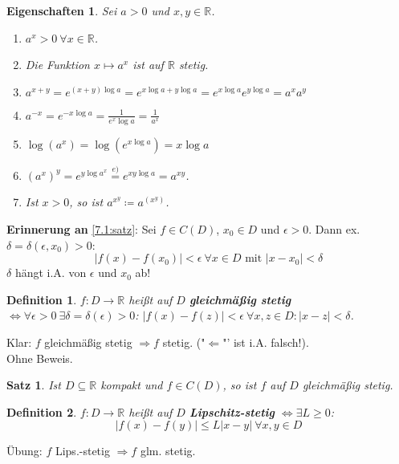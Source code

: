 \documentclass[12pt]{extreport} %
\newcommand{\R}{\mathbb{R}}
\theoremstyle{named}
\theoremstyle{dotless}
\newtheorem{satz}[unnamedtheorem]{Satz}
\newtheorem*{definition}{Definition}
\newtheorem*{eigenschaften}{Eigenschaften}
\begin{document}
\begin{eigenschaften}
	Sei $a > 0$ und $x, y \in \R$.
	\begin{enumerate}
		\item $a^{x} > 0 ~\forall x \in \R$.
		\item Die Funktion $x \mapsto a^{x}$ ist auf $\R$ stetig.
		\item $a^{x+y} = e^{(x+y)\log a} = e^{x\log a + y \log a} = e^{x \log a} e^{y \log a} = a^{x} a^{y}$
		\item $a^{-x} = e^{-x\log a} = \frac{1}{e^{x} \log a} = \frac{1}{a^{x}}$
		\item $\log(a^{x}) = \log ( e^{x \log a}) = x \log a$
		\item $(a^{x})^{y} = e^{y \log a^{x}} \overset{e)}{=} e^{xy \log a} = a^{xy}$.
		\item Ist $x > 0$, so ist $a^{x^{y}} \coloneqq a^{\left(x^{y}\right)}$.
	\end{enumerate}	
\end{eigenschaften}


\textbf{Erinnerung an} \ref{7.1:satz}: Sei $f \in C(D)$, $x_{0} \in D$ und $\epsilon > 0$. Dann ex. $\delta = \delta(\epsilon, x_{0}) > 0$:
	$$ |f(x) - f(x_{0})| < \epsilon ~\forall x \in D \text{ mit } |x - x_{0}| < \delta $$
	$\delta$ hängt i.A. von $\epsilon$ und $x_{0}$ ab!

\begin{definition}
	$f \colon D \rightarrow \R$ hei{\ss}t auf $D$ \textbf{gleichmä{\ss}ig stetig} $\iff \forall \epsilon > 0 ~\exists \delta = \delta(\epsilon) > 0$: $|f(x) - f(z)| < \epsilon ~\forall x, z \in D: |x - z| < \delta$.
\end{definition}

Klar: $f$ gleichmä{\ss}ig stetig $\Rightarrow f$ stetig. ("$\Leftarrow$"' ist i.A. falsch!). \\
Ohne Beweis.

\begin{satz} \label{7.16:satz}
	Ist $D \subseteq \R$ kompakt und $f \in C(D)$, so ist $f$ auf $D$ gleichmä{\ss}ig stetig.
\end{satz}


\begin{definition}
	$f \colon D \rightarrow \R$ hei{\ss}t auf $D$ \textbf{Lipschitz-stetig} $\iff \exists L \geq 0$:
	$$ | f(x) - f(y) | \leq L |x - y| ~\forall x, y \in D  $$
\end{definition}

Übung: $f$ Lips.-stetig $\Rightarrow f$ glm. stetig.
\end{document}
